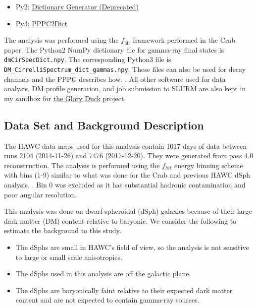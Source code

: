 \begin{itemize}
    \item Py2: \href{https://gitlab.com/hawc-observatory/sandboxes/salaza82/glory-duck-hawc/-/tree/master/GD_spectrum}{Dictionary Generator (Deprecated)}
    \item Py3: \href{https://gitlab.com/hawc-observatory/sandboxes/salaza82/pppc2dict}{PPPC2Dict}
\end{itemize}

The analysis was performed using the $f_{\textrm{hit}}$ framework performed in the Crab paper\cite{Abeysekara_2017}.
The Python2 NumPy dictionary file for gamma-ray final states is \texttt{dmCirSpecDict.npy}.
The corresponding Python3 file is \texttt{DM\_CirrelliSpectrum\_dict\_gammas.npy}.
These files can also be used for decay channels and the PPPC describes how. \cite{Cirelli_2011}.
All other software used for data analysis, DM profile generation, and job submission to SLURM are also kept in my sandbox for \href{https://gitlab.com/hawc-observatory/sandboxes/salaza82/glory-duck-hawc}{the Glory Duck} project.

\subsection{Data Set and Background Description} \label{sec:gs_data_bkgd}

The HAWC data maps used for this analysis contain 1017 days of data between runs 2104 (2014-11-26) and 7476 (2017-12-20).
They were generated from pass 4.0 reconstruction.
The analysis is performed using the $f_{hit}$ energy binning scheme with bins (1-9) similar to what was done for the Crab and previous HAWC dSph analysis. \cite{Abeysekara_2017,Albert_2018}.
Bin 0 was excluded as it has substantial hadronic contamination and poor angular resolution.

This analysis was done on dwarf spheroidal (dSph) galaxies because of their large dark matter (DM) content relative to baryonic.
We consider the following to estimate the background to this study.

\begin{itemize}
    \item The dSphs are small in HAWC's field of view, so the analysis is not sensitive to large or small scale anisotropies.
    \item The dSphs used in this analysis are off the galactic plane.
    \item The dSphs are baryonically faint relative to their expected dark matter content and are not expected to contain gamma-ray sources.
\end{itemize}

